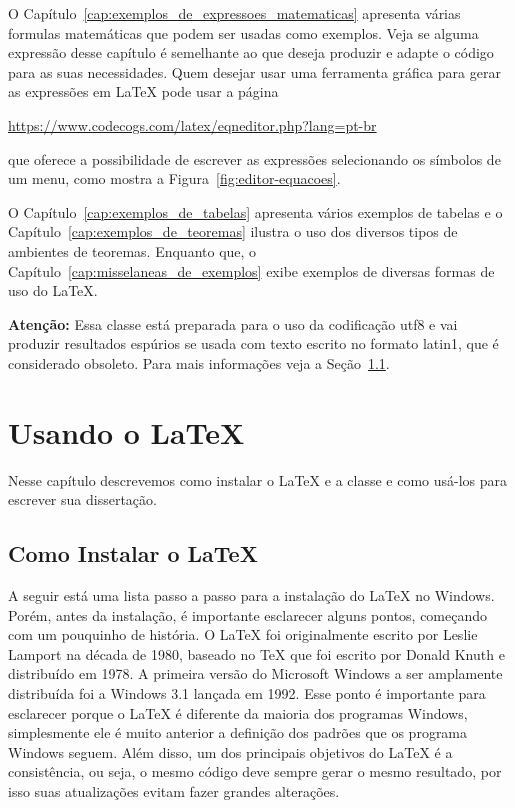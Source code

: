 \documentclass[fleqn]{profmat-cefet}
\begin{document}
O Capítulo~\ref{cap:exemplos_de_expressoes_matematicas} apresenta várias 
formulas matemáticas que podem ser usadas como exemplos. Veja se alguma
expressão desse capítulo é semelhante ao que deseja produzir e 
adapte o código para as suas necessidades. Quem desejar
usar uma ferramenta gráfica para gerar as expressões em \LaTeX{}
pode usar a página 
\begin{center}
    \url{https://www.codecogs.com/latex/eqneditor.php?lang=pt-br}
\end{center}
que oferece a possibilidade de escrever as expressões selecionando os 
símbolos de um menu, como mostra a Figura~\ref{fig:editor-equacoes}.

O Capítulo~\ref{cap:exemplos_de_tabelas} apresenta vários exemplos de tabelas
e o Capítulo~\ref{cap:exemplos_de_teoremas} ilustra o uso dos diversos
tipos de ambientes de teoremas.
Enquanto que, o Capítulo~\ref{cap:misselaneas_de_exemplos}
exibe exemplos de diversas formas de uso do \LaTeX.

\textbf{Atenção:} Essa classe está preparada para o uso da codificação
\textsf{utf8} e vai produzir resultados espúrios se usada com texto escrito no
formato \textsf{latin1}, que é considerado obsoleto. Para mais informações veja
a Seção~\ref{sec:como_instalar_o_latex}.

\chapter{Usando o \LaTeX}
\label{cap:como_escrever_uma_dissertacao}

Nesse capítulo descrevemos como instalar o \LaTeX{} e a classe e como usá-los
para escrever sua dissertação.

\section{Como Instalar o \LaTeX{}}
\label{sec:como_instalar_o_latex}

A seguir está uma lista passo a passo para a instalação do \LaTeX{} no Windows.
Porém, antes da instalação, é importante esclarecer alguns pontos, começando com
um pouquinho de história. O \LaTeX{} foi originalmente escrito por Leslie
Lamport na década de 1980, baseado no \TeX{} que foi escrito por Donald Knuth e
distribuído em 1978. A primeira versão do Microsoft Windows a ser amplamente
distribuída foi a Windows 3.1 lançada em 1992. Esse ponto é importante para
esclarecer porque o \LaTeX{} é diferente da maioria dos programas Windows,
simplesmente ele é muito anterior a definição dos padrões que os programa
Windows seguem. Além disso, um dos principais objetivos do \LaTeX{} é a
consistência, ou seja, o mesmo código deve sempre gerar o mesmo resultado, por
isso suas atualizações evitam fazer grandes alterações.
\end{document}

